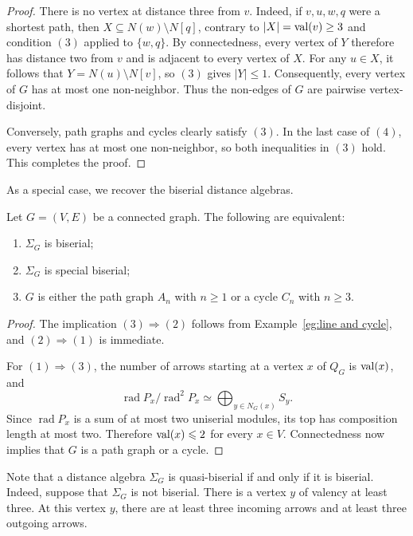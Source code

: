 \documentclass[a4paper,leqno]{amsart}
\begin{document}
\begin{proof}
There is no vertex at distance three from $v$. Indeed, if $v,u,w,q$ were a shortest path, then $X\subseteq N(w)\setminus N[q]$,
contrary to $|X|=\operatorname{val}(v)\geq3$ and condition $(3)$ applied to $\{w,q\}$. By connectedness, every vertex of $Y$ therefore has distance two from $v$ and is adjacent to every vertex of $X$. For any $u\in X$, it follows that $Y=N(u)\setminus N[v]$,
so $(3)$ gives $|Y|\leq1$. Consequently, every vertex of $G$ has at most one non-neighbor. Thus the non-edges of $G$ are pairwise vertex-disjoint.

Conversely, path graphs and cycles clearly satisfy $(3)$. In the last case of $(4)$, every vertex has at most one non-neighbor, so both inequalities in $(3)$ hold. This completes the proof.
\end{proof}

As a special case, we recover the biserial distance algebras.

\begin{prop}\label{prop:biserial}
Let $G=(V,E)$ be a connected graph. The following are equivalent:
\begin{enumerate}
\item $\Sigma_G$ is biserial;
\item $\Sigma_G$ is special biserial;
\item $G$ is either the path graph $A_n$ with $n\geq1$ or a cycle $C_n$ with $n\geq3$.
\end{enumerate}
\end{prop}

\begin{proof}
The implication $(3)\Rightarrow(2)$ follows from Example~\ref{eg:line and cycle}, and $(2)\Rightarrow(1)$ is immediate.

For $(1)\Rightarrow(3)$, the number of arrows starting at a vertex $x$ of $Q_G$ is $\operatorname{val}(x)$, and
$$\operatorname{rad}P_x/\operatorname{rad}^2P_x
\simeq\bigoplus_{y\in N_G(x)}S_y.$$
Since $\operatorname{rad}P_x$ is a sum of at most two uniserial modules, its top has composition length at most two. Therefore $\operatorname{val}(x)\leqslant2$ for every $x\in V$. Connectedness now implies that $G$ is a path graph or a cycle.
\end{proof}

\begin{rmk}
   Note that a distance algebra $\Sigma_G$ is quasi-biserial \cite{Xin24} if and only if it is biserial. Indeed, suppose that $\Sigma_G$ is not biserial. There is a vertex $y$ of valency at least three. At this vertex $y$, there are at least three incoming arrows and at least three outgoing arrows.
\end{rmk}
\end{document}
